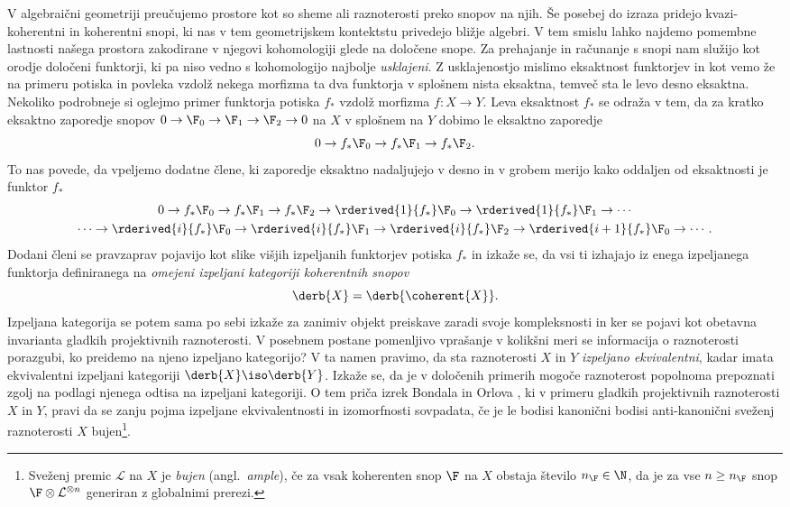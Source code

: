 

V algebraični geometriji preučujemo prostore kot so sheme ali raznoterosti preko snopov na njih. Še posebej do izraza pridejo kvazi-koherentni in koherentni snopi, ki nas v tem geometrijskem kontektstu privedejo bližje algebri. V tem smislu lahko najdemo pomembne lastnosti našega prostora zakodirane v njegovi kohomologiji glede na določene snope.
Za prehajanje in računanje s snopi nam služijo kot orodje določeni funktorji, ki pa niso vedno s kohomologijo najbolje \emph{usklajeni}. 
Z usklajenostjo mislimo eksaktnost funktorjev in kot vemo že na primeru potiska in povleka vzdolž nekega morfizma ta dva funktorja v splošnem nista eksaktna, temveč sta le levo \oz desno eksaktna. Nekoliko podrobneje si oglejmo primer funktorja potiska $f_*$ vzdolž morfizma $f \colon X \to Y$. Leva eksaktnost $f_*$ se odraža v tem, da za kratko eksaktno zaporedje snopov $0 \to \F_0 \to \F_1 \to \F_2 \to 0$ na $X$ v splošnem na $Y$ dobimo le eksaktno zaporedje
\[
    0 \to f_*\F_0 \to f_*\F_1 \to f_*\F_2.
\]
To nas povede, da vpeljemo dodatne člene, ki zaporedje eksaktno nadaljujejo v desno in v grobem merijo kako oddaljen od eksaktnosti je funktor $f_*$
\begin{multline*}
    0 \to f_*\F_0 \to f_*\F_1 \to f_*\F_2 \to \rderived{1}{f_*}\F_0 \to \rderived{1}{f_*}\F_1 \to \cdots \\
    \cdots \to \rderived{i}{f_*}\F_0 \to \rderived{i}{f_*}\F_1 \to \rderived{i}{f_*}\F_2 \to \rderived{i+1}{f_*}\F_0 \to \cdots.
\end{multline*}
Dodani členi se pravzaprav pojavijo kot slike višjih izpeljanih funktorjev potiska $f_*$ in izkaže se, da vsi ti izhajajo iz enega izpeljanega funktorja definiranega na \emph{omejeni izpeljani kategoriji koherentnih snopov}
\[
    \derb{X} = \derb{\coherent{X}}.
\]
Izpeljana kategorija se potem sama po sebi izkaže za zanimiv objekt preiskave zaradi svoje kompleksnosti in ker se pojavi kot obetavna invarianta gladkih projektivnih raznoterosti. V posebnem postane pomenljivo vprašanje v kolikšni meri se informacija o raznoterosti porazgubi, ko preidemo na njeno izpeljano kategorijo?  V ta namen pravimo, da sta raznoterosti $X$ in $Y$ \emph{izpeljano ekvivalentni}, kadar imata ekvivalentni izpeljani kategoriji $\derb{X}\iso \derb{Y}$. Izkaže se, da je v določenih primerih mogoče raznoterost popolnoma prepoznati zgolj na podlagi njenega odtisa na izpeljani kategoriji. O tem priča izrek Bondala in Orlova \cite{BondalOrlov2001}, ki v primeru gladkih projektivnih raznoterosti $X$ in $Y$, pravi da se zanju pojma izpeljane ekvivalentnosti in izomorfnosti sovpadata, če je le bodisi kanonični bodisi anti-kanonični sveženj raznoterosti $X$ bujen\footnote{
    Sveženj premic $\mathcal L$ na $X$ je \emph{bujen} (angl.~\emph{ample}), če za vsak koherenten snop $\F$ na $X$ obstaja število $n_\F \in \N$, da je za vse $n \geq n_\F$ snop $\F \otimes \mathcal L^{\otimes n}$ generiran z globalnimi prerezi.
}.
